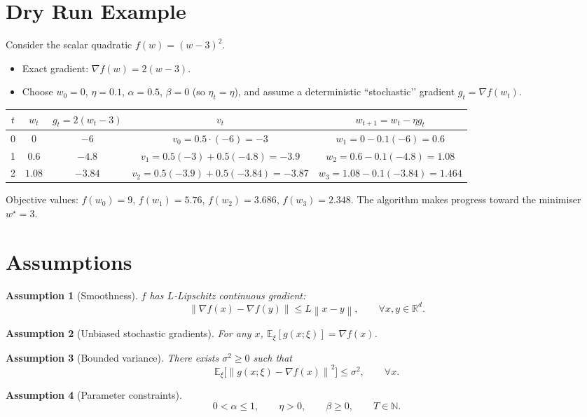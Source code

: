 \documentclass{article}
\newtheorem{assumption}{Assumption}
\newcommand{\E}{\mathbb{E}}
\newcommand{\norm}[1]{\left\|#1\right\|}
\newcommand{\grad}{\nabla}
\begin{document}
\section*{Dry Run Example}
Consider the scalar quadratic $f(w)=(w-3)^2$.
\begin{itemize}
    \item Exact gradient: $\grad f(w)=2(w-3)$.
    \item Choose $w_0=0$, $\eta=0.1$, $\alpha=0.5$, $\beta=0$ (so $\eta_t=\eta$), and assume a deterministic ``stochastic’’ gradient $g_t=\grad f(w_t)$.
\end{itemize}
\begin{center}
\begin{tabular}{c|c|c|c|c}
$t$ & $w_t$ & $g_t=2(w_t-3)$ & $v_t$ & $w_{t+1}=w_t-\eta g_t$ \\ \hline
0 & $0$ & $-6$ & $v_0=0.5\cdot(-6)=-3$ & $w_1=0-0.1(-6)=0.6$\\
1 & $0.6$ & $-4.8$ & $v_1=0.5(-3)+0.5(-4.8)=-3.9$ & $w_2=0.6-0.1(-4.8)=1.08$\\
2 & $1.08$ & $-3.84$ & $v_2=0.5(-3.9)+0.5(-3.84)=-3.87$ & $w_3=1.08-0.1(-3.84)=1.464$\\
\end{tabular}
\end{center}
Objective values: $f(w_0)=9$, $f(w_1)=5.76$, $f(w_2)=3.686$, $f(w_3)=2.348$. The algorithm makes progress toward the minimiser $w^\star=3$.

\newpage
\section*{Assumptions}
\begin{assumption}[Smoothness]\label{ass:smooth}
$f$ has $L$‑Lipschitz continuous gradient:
\[
    \norm{\grad f(x)-\grad f(y)}\le L\norm{x-y},\qquad\forall x,y\in\mathbb{R}^d .
\]
\end{assumption}
\begin{assumption}[Unbiased stochastic gradients]\label{ass:unbiased}
For any $x$, $\E_{\xi}[g(x;\xi)]=\grad f(x)$.
\end{assumption}
\begin{assumption}[Bounded variance]\label{ass:variance}
There exists $\sigma^2\ge0$ such that
\[
    \E_{\xi}\bigl[\norm{g(x;\xi)-\grad f(x)}^2\bigr]\le\sigma^2,\qquad\forall x .
\]
\end{assumption}
\begin{assumption}[Parameter constraints]\label{ass:params}
\[
    0<\alpha\le 1,\qquad \eta>0,\qquad \beta\ge0,\qquad T\in\mathbb{N}.
\]
\end{assumption}
\end{document}
